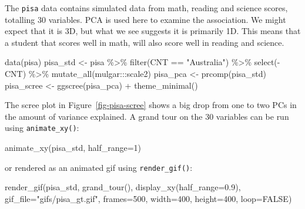 \documentclass[
  letterpaper,
]{book}
\newenvironment{Shaded}{\begin{snugshade}}{\end{snugshade}}
\newcommand{\AttributeTok}[1]{\textcolor[rgb]{0.40,0.45,0.13}{#1}}
\newcommand{\ConstantTok}[1]{\textcolor[rgb]{0.56,0.35,0.01}{#1}}
\newcommand{\DecValTok}[1]{\textcolor[rgb]{0.68,0.00,0.00}{#1}}
\newcommand{\FloatTok}[1]{\textcolor[rgb]{0.68,0.00,0.00}{#1}}
\newcommand{\FunctionTok}[1]{\textcolor[rgb]{0.28,0.35,0.67}{#1}}
\newcommand{\NormalTok}[1]{\textcolor[rgb]{0.00,0.23,0.31}{#1}}
\newcommand{\OtherTok}[1]{\textcolor[rgb]{0.00,0.23,0.31}{#1}}
\newcommand{\SpecialCharTok}[1]{\textcolor[rgb]{0.37,0.37,0.37}{#1}}
\newcommand{\StringTok}[1]{\textcolor[rgb]{0.13,0.47,0.30}{#1}}
\begin{document}
The \texttt{pisa} data contains simulated data from math, reading and
science scores, totalling 30 variables. PCA is used here to examine the
association. We might expect that it is 3D, but what we see suggests it
is primarily 1D. This means that a student that scores well in math,
will also score well in reading and science.

\begin{Shaded}
\begin{Highlighting}[]
\FunctionTok{data}\NormalTok{(pisa)}
\NormalTok{pisa\_std }\OtherTok{\textless{}{-}}\NormalTok{ pisa }\SpecialCharTok{\%\textgreater{}\%}
  \FunctionTok{filter}\NormalTok{(CNT }\SpecialCharTok{==} \StringTok{"Australia"}\NormalTok{) }\SpecialCharTok{\%\textgreater{}\%}
  \FunctionTok{select}\NormalTok{(}\SpecialCharTok{{-}}\NormalTok{CNT) }\SpecialCharTok{\%\textgreater{}\%}
  \FunctionTok{mutate\_all}\NormalTok{(mulgar}\SpecialCharTok{:::}\NormalTok{scale2)}
\NormalTok{pisa\_pca }\OtherTok{\textless{}{-}} \FunctionTok{prcomp}\NormalTok{(pisa\_std)}
\NormalTok{pisa\_scree }\OtherTok{\textless{}{-}} \FunctionTok{ggscree}\NormalTok{(pisa\_pca) }\SpecialCharTok{+} \FunctionTok{theme\_minimal}\NormalTok{()}
\end{Highlighting}
\end{Shaded}

The scree plot in Figure~\ref{fig-pisa-scree} shows a big drop from one
to two PCs in the amount of variance explained. A grand tour on the 30
variables can be run using \texttt{animate\_xy()}:

\begin{Shaded}
\begin{Highlighting}[]
\FunctionTok{animate\_xy}\NormalTok{(pisa\_std, }\AttributeTok{half\_range=}\DecValTok{1}\NormalTok{)}
\end{Highlighting}
\end{Shaded}

or rendered as an animated gif using \texttt{render\_gif()}:

\begin{Shaded}
\begin{Highlighting}[]
\FunctionTok{render\_gif}\NormalTok{(pisa\_std, }
           \FunctionTok{grand\_tour}\NormalTok{(), }
           \FunctionTok{display\_xy}\NormalTok{(}\AttributeTok{half\_range=}\FloatTok{0.9}\NormalTok{),}
           \AttributeTok{gif\_file=}\StringTok{"gifs/pisa\_gt.gif"}\NormalTok{,}
           \AttributeTok{frames=}\DecValTok{500}\NormalTok{,}
           \AttributeTok{width=}\DecValTok{400}\NormalTok{,}
           \AttributeTok{height=}\DecValTok{400}\NormalTok{,}
           \AttributeTok{loop=}\ConstantTok{FALSE}\NormalTok{)}
\end{Highlighting}
\end{Shaded}
\end{document}

